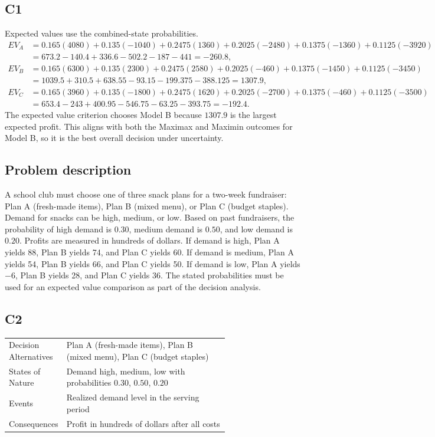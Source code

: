 \begin{ExamProblems}
		\subsection*{C1}
		Expected values use the combined-state probabilities.
		\[
		\begin{aligned}
		EV_A &= 0.165(4080)+0.135(-1040)+0.2475(1360)+0.2025(-2480)+0.1375(-1360)+0.1125(-3920)\\
		&= 673.2-140.4+336.6-502.2-187-441=-260.8,\\
		EV_B &= 0.165(6300)+0.135(2300)+0.2475(2580)+0.2025(-460)+0.1375(-1450)+0.1125(-3450)\\
		&= 1039.5+310.5+638.55-93.15-199.375-388.125=1307.9,\\
		EV_C &= 0.165(3960)+0.135(-1800)+0.2475(1620)+0.2025(-2700)+0.1375(-460)+0.1125(-3500)\\
		&= 653.4-243+400.95-546.75-63.25-393.75=-192.4.
		\end{aligned}
		\]
		The expected value criterion chooses Model B because $1307.9$ is the largest expected profit. This aligns with both the Maximax and Maximin outcomes for Model B, so it is the best overall decision under uncertainty.

		\item
		\subsection*{Problem description}
		A school club must choose one of three snack plans for a two-week fundraiser: Plan A (fresh-made items),
		Plan B (mixed menu), or Plan C (budget staples). Demand for snacks can be high, medium, or low. Based on past fundraisers, the probability of high demand is $0.30$, medium demand is $0.50$, and low demand is $0.20$. Profits are measured in hundreds of dollars. If demand is high, Plan A yields 88, Plan B yields 74, and Plan C yields 60. If demand is medium, Plan A yields 54, Plan B yields 66, and Plan C yields 50. If demand is low, Plan A yields $-6$, Plan B yields 28, and Plan C yields 36. The stated probabilities must be used for an expected value comparison as part of the decision analysis.

		\subsection*{C2}
		\begin{center}
			\begin{tabular}{l p{0.74\linewidth}}
				\toprule
				Decision Alternatives & Plan A (fresh-made items), Plan B (mixed menu), Plan C (budget staples) \\
				States of Nature & Demand high, medium, low with probabilities $0.30$, $0.50$, $0.20$ \\
				Events & Realized demand level in the serving period \\
				Consequences & Profit in hundreds of dollars after all costs \\
				\bottomrule
			\end{tabular}
		\end{center}


\end{ExamProblems}

